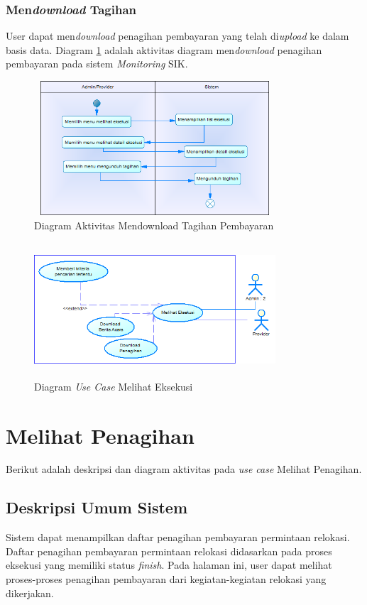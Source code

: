 	\subsubsection{Men\textit{download} Tagihan}
	User dapat men\textit{download} penagihan pembayaran yang telah di\textit{upload} ke dalam basis data. Diagram \ref{figure:activity_mendownload_tagihan} adalah aktivitas diagram men\textit{download} penagihan pembayaran pada sistem \textit{Monitoring} SIK.
	\begin{figure}[h]
	\centerline
	{\includegraphics[width=9cm,height=5cm]{bab4/ActivityDiagram_DownloadTagihan.png}}
	\caption{Diagram Aktivitas Mendownload Tagihan Pembayaran}
	\label{figure:activity_mendownload_tagihan}
	\end{figure}

	\begin{figure}[h!]
	\centerline
	{\includegraphics[width=9cm,height=5cm]{bab4/use-case-melihat-eksekusi.png}}
	\caption{Diagram \textit{Use Case} Melihat Eksekusi}
	\label{figure:use_case_melihat_eksekusi}
	\end{figure}
	
\section{Melihat Penagihan}
Berikut adalah deskripsi dan diagram aktivitas pada \textit{use case} Melihat Penagihan.
\subsection{Deskripsi Umum Sistem}
\tab Sistem dapat menampilkan daftar penagihan pembayaran permintaan relokasi. Daftar penagihan pembayaran permintaan relokasi didasarkan pada proses eksekusi yang memiliki status \textit{finish}. Pada halaman ini, user dapat melihat proses-proses penagihan pembayaran dari kegiatan-kegiatan relokasi yang dikerjakan.
